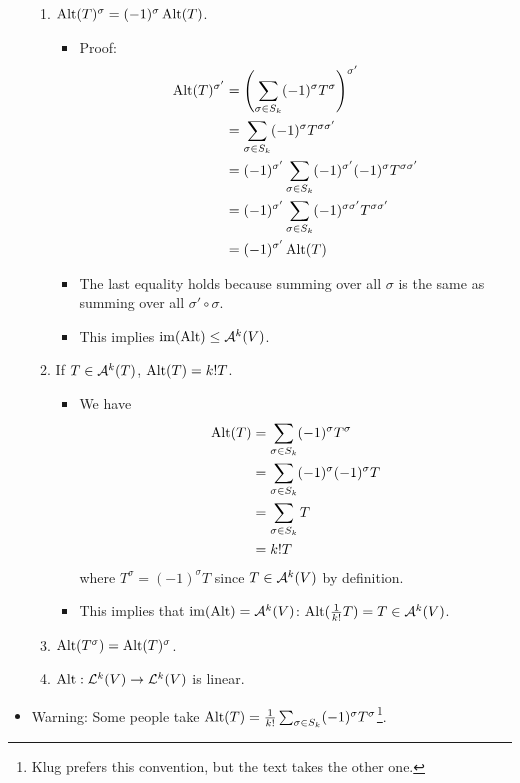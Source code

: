 \documentclass[../notes.tex]{subfiles}
\begin{document}
\begin{itemize}
\begin{enumerate}
        \item $\Alt(T)^\sigma=(-1)^\sigma\Alt(T)$.
        \begin{itemize}
            \item Proof:
            \begin{align*}
                \Alt(T)^{\sigma'} &= \left( \sum_{\sigma\in S_k}(-1)^\sigma T^\sigma \right)^{\sigma'}\\
                &= \sum_{\sigma\in S_k}(-1)^\sigma T^{\sigma\sigma'}\\
                &= (-1)^{\sigma'}\sum_{\sigma\in S_k}(-1)^{\sigma'}(-1)^\sigma T^{\sigma\sigma'}\\
                &= (-1)^{\sigma'}\sum_{\sigma\in S_k}(-1)^{\sigma\sigma'}T^{\sigma\sigma'}\\
                &= (-1)^{\sigma'}\Alt(T)
            \end{align*}
            \item The last equality holds because summing over all $\sigma$ is the same as summing over all $\sigma'\circ\sigma$.
            \item This implies $\im(\Alt)\leq\alt[k]{V}$.
        \end{itemize}
        \item If $T\in\alt[k]{T}$, $\Alt(T)=k!T$.
        \begin{itemize}
            \item We have
            \begin{align*}
                \Alt(T) &= \sum_{\sigma\in S_k}(-1)^\sigma T^\sigma\\
                &= \sum_{\sigma\in S_k}(-1)^\sigma(-1)^\sigma T\\
                &= \sum_{\sigma\in S_k}T\\
                &= k!T
            \end{align*}
            where $T^\sigma=(-1)^\sigma T$ since $T\in\alt[k]{V}$ by definition.
            \item This implies that $\im(\Alt)=\alt[k]{V}$: $\Alt(\frac{1}{k!}T)=T\in\alt[k]{V}$.
        \end{itemize}
        \item $\Alt(T^\sigma)=\Alt(T)^\sigma$.
        \item $\Alt:\lin[k]{V}\to\lin[k]{V}$ is linear.
    \end{enumerate}
    \item Warning: Some people take $\Alt(T)=\frac{1}{k!}\sum_{\sigma\in S_k}(-1)^\sigma T^\sigma$\footnote{Klug prefers this convention, but the text takes the other one.}.

\end{itemize}
\end{document}
